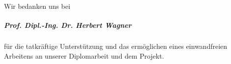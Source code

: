 \begin{acknowledgements}
    Wir bedanken uns bei
    \subparagraph{Prof. Dipl.-Ing. Dr. Herbert Wagner} für die tatkräftige Unterstützung und das ermöglichen eines einwandfreien Arbeitens an unserer Diplomarbeit und dem Projekt.
\end{acknowledgements}
